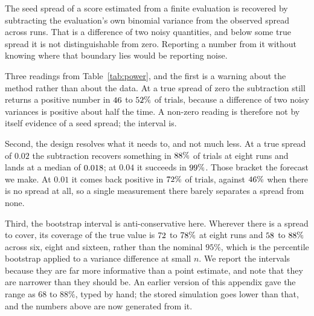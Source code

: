 The seed spread of a score estimated from a finite evaluation is recovered by subtracting the
evaluation's own binomial variance from the observed spread across runs. That is a difference of
two noisy quantities, and below some true spread it is not distinguishable from zero. Reporting a
number from it without knowing where that boundary lies would be reporting noise.

\begin{table}[t]
  \centering
  
  \caption{Simulating the design as run, with $48$ held-out questions and $16$ samples each at a
  pass rate near $0.35$, over a range of true seed spreads. \emph{Resolved} is the fraction of trials in
  which the subtraction returns something positive; \emph{estimate} is the median of what it
  returns.}
  \label{tab:power}
\end{table}

Three readings from Table~\ref{tab:power}, and the first is a warning about the method rather than
about the data. At a true
spread of zero the subtraction still returns a positive number in $46$ to
$52\%$ of trials, because a difference of two noisy variances is positive about half
the time. A non-zero reading is therefore not by itself evidence of a seed spread; the interval is.

Second, the design resolves what it needs to, and not much less. At a true spread of $0.02$ the
subtraction recovers something in $88\%$ of trials at eight runs and
lands at a median of $0.018$; at $0.04$ it succeeds in $99\%$.
Those bracket the forecast we make. At $0.01$ it comes back positive in
$72\%$ of trials, against $46\%$ when there is no spread at
all, so a single measurement there barely separates a spread from none.

Third, the bootstrap interval is anti-conservative here. Wherever there is a spread to cover, its
coverage of the true value is $72$ to $78\%$ at
eight runs and $58$ to $88\%$ across six,
eight and sixteen, rather than the nominal $95\%$, which is the percentile bootstrap applied to a
variance difference at small $n$. We report the intervals because they are far more informative
than a point estimate, and note that they are narrower than they should be. An earlier version of
this appendix gave the range as $68$ to $88\%$, typed by hand; the stored simulation goes lower
than that, and the numbers above are now generated from it.

